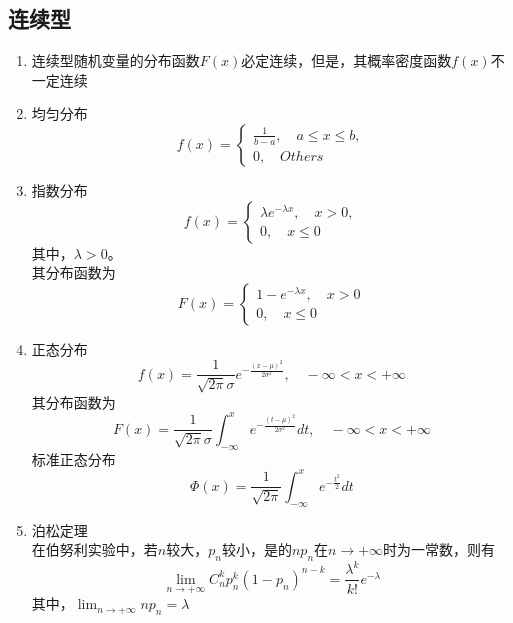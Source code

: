\subsection{连续型}
\begin{enumerate}
	\item 连续型随机变量的分布函数$F(x)$必定连续，但是，其概率密度函数$f(x)$不一定连续
	\item 均匀分布
	\[ f(x)=\begin{cases}
	\frac{1}{b-a}, \quad a \leq x \leq b, \\
	0, \quad Others
	\end{cases} \]

	\item 指数分布
	\[ f(x)=\begin{cases}
	\lambda e^{-\lambda x}, \quad x>0, \\
	0, \quad x \leq 0
	\end{cases} \]
	其中，$\lambda>0$。 \\
	其分布函数为
	\[ F(x)=\begin{cases}
	1-e^{-\lambda x}, \quad x>0 \\
	0, \quad x \leq 0
	\end{cases} \]

	\item 正态分布
	\begin{equation}
		f(x) = \frac{1}{\sqrt{2\pi} \sigma}e^{-\frac{(x-\mu)^2}{2\sigma^2}}, \quad -\infty < x < +\infty
	\end{equation}
	其分布函数为
	\begin{equation}
		F(x) = \frac{1}{\sqrt{2\pi}\sigma} \int_{-\infty}^x  e^{-\frac{(t-\mu)^2}{2\sigma^2}} dt, \quad -\infty < x < +\infty
	\end{equation}
	标准正态分布
	\begin{equation}
		\Phi(x) = \frac{1}{\sqrt{2\pi}} \int_{-\infty}^x e^{-\frac{t^2}{2}} dt
	\end{equation}

	\item 泊松定理 \\
	在伯努利实验中，若$n$较大，$p_n$较小，是的$np_n$在$n \to +\infty$时为一常数，则有
	\begin{equation}
		\lim_{n \to +\infty}C_n^kp_n^k(1-p_n)^{n-k} = \frac{\lambda ^k}{k!}e^{-\lambda}
	\end{equation}
	其中，$\lim_{n\to+\infty}np_n = \lambda$

\end{enumerate}






